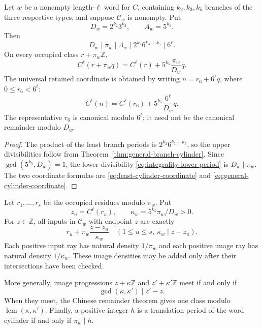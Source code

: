 \begin{corollary}
\label{cor:corrected-six-cylinder}
Let $w$ be a nonempty length-$\ell$ word for $C$, containing $k_2,k_3,k_5$
branches of the three respective types, and suppose $\mathcal C_w$ is
nonempty.  Put
\[
 D_w=2^{k_2}3^{k_3},\qquad A_w=5^{k_5}.
\]
Then
\begin{equation}
 D_w\mid\pi_w\mid\Lambda_w
 \mid 2^{k_2}6^{k_3+k_5}\mid6^\ell.
 \label{eq:five-map-period-chain}
\end{equation}
On every occupied class $r+\pi_w\mathbb Z$,
\begin{equation}
 C^\ell(r+\pi_wq)=C^\ell(r)
       +5^{k_5}\frac{\pi_w}{D_w}q.
 \label{eq:optimal-five-map-coordinate}
\end{equation}
The universal retained coordinate is obtained by writing
$n=r_6+6^\ell q$, where $0\le r_6<6^\ell$:
\begin{equation}
 C^\ell(n)=C^\ell(r_6)
       +5^{k_5}\frac{6^\ell}{D_w}q.
 \label{eq:corrected-six-cylinder}
\end{equation}
The representative $r_6$ is canonical modulo $6^\ell$; it need not be the
canonical remainder modulo $D_w$.
\end{corollary}

\begin{proof}
The product of the least branch periods is
$2^{k_2}6^{k_3+k_5}$, so the upper divisibilities follow from
Theorem~\ref{thm:general-branch-cylinder}.  Since
$\gcd(5^{k_5},D_w)=1$, the lower divisibility
\eqref{eq:integrality-lower-period} is $D_w\mid\pi_w$.  The two coordinate
formulas are \eqref{eq:least-cylinder-coordinate} and
\eqref{eq:general-cylinder-coordinate}.
\end{proof}

\begin{corollary}
\label{cor:five-map-enumeration}
Let $r_1,\ldots,r_s$ be the occupied residues modulo $\pi_w$.  Put
\[
 z_u=C^\ell(r_u),\qquad
 \kappa_w=5^{k_5}\pi_w/D_w>0.
\]
For $z\in\mathbb Z$, all inputs in $\mathcal C_w$ with endpoint $z$ are
exactly
\[
 r_u+\pi_w\frac{z-z_u}{\kappa_w}
 \quad(1\le u\le s,\ \kappa_w\mid z-z_u).
 \tag{1.14}\label{eq:five-map-full-fibre}
\]
Each positive input ray has natural density $1/\pi_w$ and each positive
image ray has natural density $1/\kappa_w$.  These image densities may be
added only after their intersections have been checked.

More generally, image progressions $z+\kappa\mathbb Z$ and
$z'+\kappa'\mathbb Z$ meet if and only if
\begin{equation}
 \gcd(\kappa,\kappa')\mid z'-z.
 \label{eq:two-cylinder-crt}
\end{equation}
When they meet, the Chinese remainder theorem gives one class modulo
$\operatorname{lcm}(\kappa,\kappa')$.  Finally, a positive integer $h$ is a
translation period of the word cylinder if and only if $\pi_w\mid h$.
\end{corollary}

